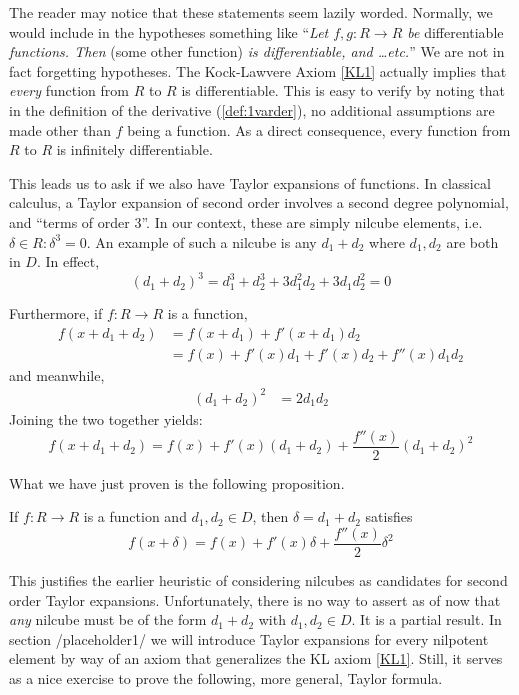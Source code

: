 The reader may notice that these statements seem lazily worded. Normally, we would include in the hypotheses something like ``\textit{Let \( f,g:R\to R \) be} differentiable \textit{functions. Then} (some other function) \textit{is differentiable, and \dots etc.}'' We are not in fact forgetting hypotheses. The Kock-Lawvere Axiom \ref{KL1} actually implies that \textit{every} function from \( R \) to \( R \) is differentiable. This is easy to verify by noting that in the definition of the derivative (\ref{def:1varder}), no additional assumptions are made other than \( f \) being a function. As a direct consequence, every function from \( R \) to \( R \) is infinitely differentiable.

This leads us to ask if we also have Taylor expansions of functions. In classical calculus, a Taylor expansion of second order involves a second degree polynomial, and ``terms of order 3''. In our context, these are simply nilcube elements, i.e. \( \delta\in R : \delta^3 = 0 \). An example of such a nilcube is any \( d_1+d_2 \) where \( d_1,d_2 \) are both in \( D \). In effect,
\begin{equation*}
  (d_1+d_2)^3 = d_1^3 + d_2^3 + 3d_1^2d_2 + 3d_1d_2^2 = 0
\end{equation*}

Furthermore, if \( f:R\to R\) is a function, 
\begin{align*}
  f(x+d_1+d_2) & = f(x+d_1)+f'(x+d_1)d_2 \\
               & = f(x) + f'(x)d_1 + f'(x)d_2 + f''(x)d_1d_2
\end{align*}
and meanwhile,
\begin{align*}
  (d_1+d_2)^2 & = 2d_1d_2
\end{align*}
Joining the two together yields:
\begin{equation*}
  f(x+d_1+d_2) = f(x) + f'(x)(d_1+d_2) + \frac{f''(x)}{2}(d_1+d_2)^2
\end{equation*}

What we have just proven is the following proposition.
\begin{proposition}
  If \( f:R\to R \) is a function and \( d_1,d_2\in D \), then \( \delta = d_1+d_2 \) satisfies
  \begin{equation*}
    f(x+\delta) = f(x) + f'(x)\delta + \frac{f''(x)}{2}\delta^2
  \end{equation*}

\end{proposition}

This justifies the earlier heuristic of considering nilcubes as candidates for second order Taylor expansions. Unfortunately, there is no way to assert as of now that \textit{any} nilcube must be of the form \( d_1+d_2 \) with \( d_1,d_2\in D \). It is a partial result. In section {/placeholder1/} we will introduce Taylor expansions for every nilpotent element by way of an axiom that generalizes the KL axiom \ref{KL1}. Still, it serves as a nice exercise to prove the following, more general, Taylor formula.

